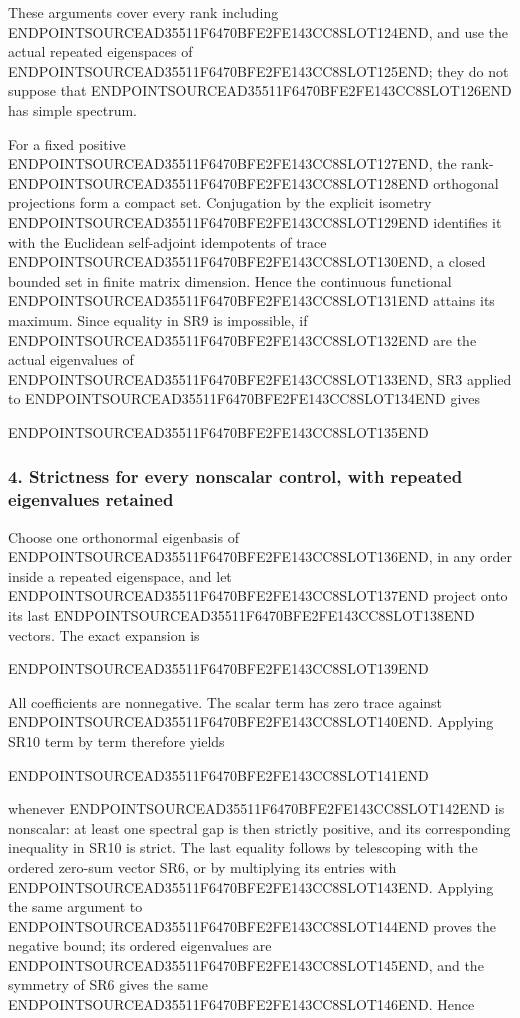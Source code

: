These arguments cover every rank including ENDPOINTSOURCEAD35511F6470BFE2FE143CC8SLOT124END, and use the actual repeated eigenspaces of ENDPOINTSOURCEAD35511F6470BFE2FE143CC8SLOT125END; they do not suppose that ENDPOINTSOURCEAD35511F6470BFE2FE143CC8SLOT126END has simple spectrum.

For a fixed positive ENDPOINTSOURCEAD35511F6470BFE2FE143CC8SLOT127END, the rank-ENDPOINTSOURCEAD35511F6470BFE2FE143CC8SLOT128END orthogonal projections form a compact set. Conjugation by the explicit isometry ENDPOINTSOURCEAD35511F6470BFE2FE143CC8SLOT129END identifies it with the Euclidean self-adjoint idempotents of trace ENDPOINTSOURCEAD35511F6470BFE2FE143CC8SLOT130END, a closed bounded set in finite matrix dimension. Hence the continuous functional ENDPOINTSOURCEAD35511F6470BFE2FE143CC8SLOT131END attains its maximum. Since equality in SR9 is impossible, if ENDPOINTSOURCEAD35511F6470BFE2FE143CC8SLOT132END are the actual eigenvalues of ENDPOINTSOURCEAD35511F6470BFE2FE143CC8SLOT133END, SR3 applied to ENDPOINTSOURCEAD35511F6470BFE2FE143CC8SLOT134END gives

ENDPOINTSOURCEAD35511F6470BFE2FE143CC8SLOT135END

\subsubsection{4. Strictness for every nonscalar control, with repeated eigenvalues retained}\label{endpoint-four_window_sharpness_review--strictness-for-every-nonscalar-control-with-repeated-eigenvalues-retained}

Choose one orthonormal eigenbasis of ENDPOINTSOURCEAD35511F6470BFE2FE143CC8SLOT136END, in any order inside a repeated eigenspace, and let ENDPOINTSOURCEAD35511F6470BFE2FE143CC8SLOT137END project onto its last ENDPOINTSOURCEAD35511F6470BFE2FE143CC8SLOT138END vectors. The exact expansion is

ENDPOINTSOURCEAD35511F6470BFE2FE143CC8SLOT139END

All coefficients are nonnegative. The scalar term has zero trace against ENDPOINTSOURCEAD35511F6470BFE2FE143CC8SLOT140END. Applying SR10 term by term therefore yields

ENDPOINTSOURCEAD35511F6470BFE2FE143CC8SLOT141END

whenever ENDPOINTSOURCEAD35511F6470BFE2FE143CC8SLOT142END is nonscalar: at least one spectral gap is then strictly positive, and its corresponding inequality in SR10 is strict. The last equality follows by telescoping with the ordered zero-sum vector SR6, or by multiplying its entries with ENDPOINTSOURCEAD35511F6470BFE2FE143CC8SLOT143END. Applying the same argument to ENDPOINTSOURCEAD35511F6470BFE2FE143CC8SLOT144END proves the negative bound; its ordered eigenvalues are ENDPOINTSOURCEAD35511F6470BFE2FE143CC8SLOT145END, and the symmetry of SR6 gives the same ENDPOINTSOURCEAD35511F6470BFE2FE143CC8SLOT146END. Hence

